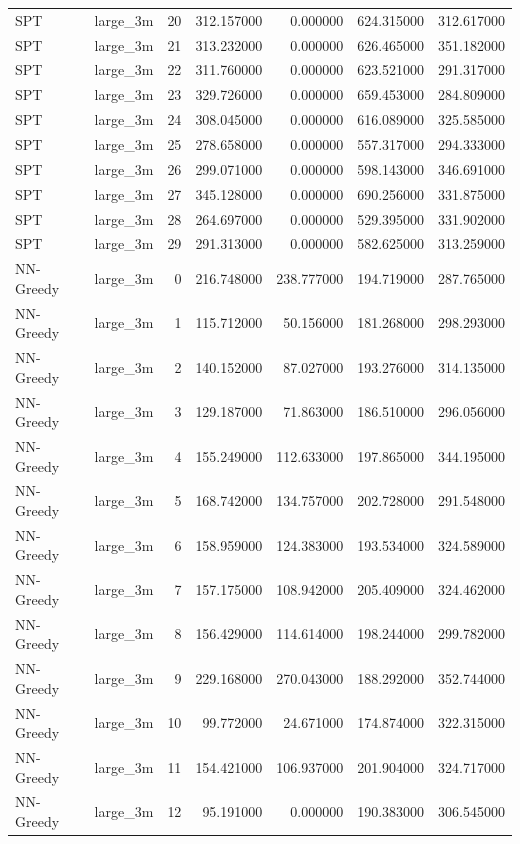 \begin{tabular}{llrrrrr}
SPT & large_3m & 20 & 312.157000 & 0.000000 & 624.315000 & 312.617000 \\
SPT & large_3m & 21 & 313.232000 & 0.000000 & 626.465000 & 351.182000 \\
SPT & large_3m & 22 & 311.760000 & 0.000000 & 623.521000 & 291.317000 \\
SPT & large_3m & 23 & 329.726000 & 0.000000 & 659.453000 & 284.809000 \\
SPT & large_3m & 24 & 308.045000 & 0.000000 & 616.089000 & 325.585000 \\
SPT & large_3m & 25 & 278.658000 & 0.000000 & 557.317000 & 294.333000 \\
SPT & large_3m & 26 & 299.071000 & 0.000000 & 598.143000 & 346.691000 \\
SPT & large_3m & 27 & 345.128000 & 0.000000 & 690.256000 & 331.875000 \\
SPT & large_3m & 28 & 264.697000 & 0.000000 & 529.395000 & 331.902000 \\
SPT & large_3m & 29 & 291.313000 & 0.000000 & 582.625000 & 313.259000 \\
NN-Greedy & large_3m & 0 & 216.748000 & 238.777000 & 194.719000 & 287.765000 \\
NN-Greedy & large_3m & 1 & 115.712000 & 50.156000 & 181.268000 & 298.293000 \\
NN-Greedy & large_3m & 2 & 140.152000 & 87.027000 & 193.276000 & 314.135000 \\
NN-Greedy & large_3m & 3 & 129.187000 & 71.863000 & 186.510000 & 296.056000 \\
NN-Greedy & large_3m & 4 & 155.249000 & 112.633000 & 197.865000 & 344.195000 \\
NN-Greedy & large_3m & 5 & 168.742000 & 134.757000 & 202.728000 & 291.548000 \\
NN-Greedy & large_3m & 6 & 158.959000 & 124.383000 & 193.534000 & 324.589000 \\
NN-Greedy & large_3m & 7 & 157.175000 & 108.942000 & 205.409000 & 324.462000 \\
NN-Greedy & large_3m & 8 & 156.429000 & 114.614000 & 198.244000 & 299.782000 \\
NN-Greedy & large_3m & 9 & 229.168000 & 270.043000 & 188.292000 & 352.744000 \\
NN-Greedy & large_3m & 10 & 99.772000 & 24.671000 & 174.874000 & 322.315000 \\
NN-Greedy & large_3m & 11 & 154.421000 & 106.937000 & 201.904000 & 324.717000 \\
NN-Greedy & large_3m & 12 & 95.191000 & 0.000000 & 190.383000 & 306.545000 \\

\end{tabular}
